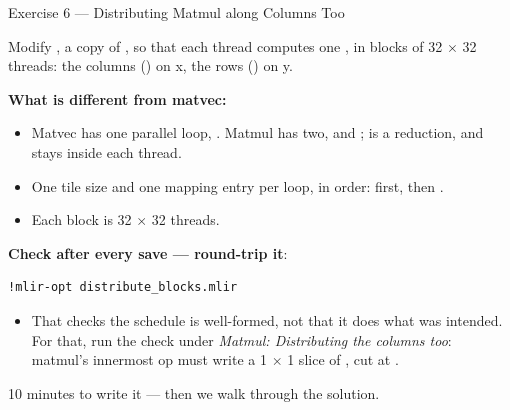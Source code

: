 \documentclass[aspectratio=169,10pt]{beamer}
\begin{document}
\begin{frame}[fragile]{Exercise 6 --- Distributing Matmul along Columns Too}
  \begin{center}\large
    Modify , a copy of
    , so that each thread computes one
    \mbox{}, in blocks of 32 $\times$ 32 threads: the columns
    () on x, the rows () on y.
  \end{center}
  \vspace{0.1em}
  \textbf{What is different from matvec:}
  \begin{itemize}
    \item Matvec has one parallel loop, . Matmul has two,  and
      ;  is a reduction, and stays inside each thread.
    \item One tile size and one mapping entry per loop, in
       order:  first, then .
    \item Each block is 32 $\times$ 32 threads.
  \end{itemize}
  \vspace{0.3em}
  \textbf{Check after every save --- round-trip it}:
\begin{lstlisting}[style=plain,basicstyle=\ttfamily\small]
!mlir-opt distribute_blocks.mlir
\end{lstlisting}
  \vspace{0.1em}
  \begin{itemize}
    \item That checks the schedule is well-formed, not that it does what was
      intended. For that, run the check under \emph{Matmul: Distributing the
      columns too}: matmul's innermost op must write a 1 $\times$ 1 slice of
      , cut at .
  \end{itemize}
  \vspace{0.3em}
  \begin{center}\color{scaccent}\large
    10 minutes to write it --- then we walk through the solution.
  \end{center}
\end{frame}
\end{document}
